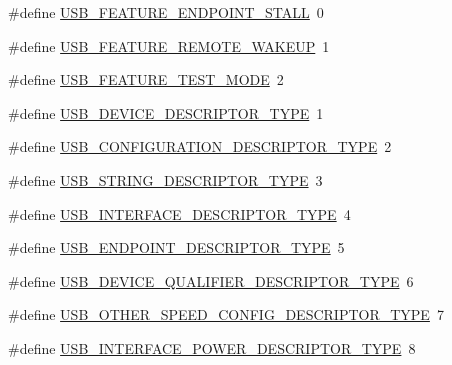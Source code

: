 \begin{DoxyCompactItemize}
\item 
\#define \hyperlink{group___u_s_b_d___core_ga3ff0518fb298c9c9b556f59c0468ec0d}{U\+S\+B\+\_\+\+F\+E\+A\+T\+U\+R\+E\+\_\+\+E\+N\+D\+P\+O\+I\+N\+T\+\_\+\+S\+T\+A\+LL}~0
\item 
\#define \hyperlink{group___u_s_b_d___core_ga2185a0541f4155470596c9c739c1656b}{U\+S\+B\+\_\+\+F\+E\+A\+T\+U\+R\+E\+\_\+\+R\+E\+M\+O\+T\+E\+\_\+\+W\+A\+K\+E\+UP}~1
\item 
\#define \hyperlink{group___u_s_b_d___core_ga90a1a76a81c04849dc897dacf6c3a213}{U\+S\+B\+\_\+\+F\+E\+A\+T\+U\+R\+E\+\_\+\+T\+E\+S\+T\+\_\+\+M\+O\+DE}~2
\end{DoxyCompactItemize}
\begin{DoxyCompactItemize}
\item 
\#define \hyperlink{group___u_s_b_d___core_ga722f2d6ee2892228b6708e8b9904c645}{U\+S\+B\+\_\+\+D\+E\+V\+I\+C\+E\+\_\+\+D\+E\+S\+C\+R\+I\+P\+T\+O\+R\+\_\+\+T\+Y\+PE}~1
\item 
\#define \hyperlink{group___u_s_b_d___core_ga45e81401e4b530280fdd539da1b06c26}{U\+S\+B\+\_\+\+C\+O\+N\+F\+I\+G\+U\+R\+A\+T\+I\+O\+N\+\_\+\+D\+E\+S\+C\+R\+I\+P\+T\+O\+R\+\_\+\+T\+Y\+PE}~2
\item 
\#define \hyperlink{group___u_s_b_d___core_gab01c9c74f2eb266b20aecd48bab4b35c}{U\+S\+B\+\_\+\+S\+T\+R\+I\+N\+G\+\_\+\+D\+E\+S\+C\+R\+I\+P\+T\+O\+R\+\_\+\+T\+Y\+PE}~3
\item 
\#define \hyperlink{group___u_s_b_d___core_gad1699884fa580bba35246a566264c978}{U\+S\+B\+\_\+\+I\+N\+T\+E\+R\+F\+A\+C\+E\+\_\+\+D\+E\+S\+C\+R\+I\+P\+T\+O\+R\+\_\+\+T\+Y\+PE}~4
\item 
\#define \hyperlink{group___u_s_b_d___core_ga4e8d6d81a224f8b511edc92b6cb4e085}{U\+S\+B\+\_\+\+E\+N\+D\+P\+O\+I\+N\+T\+\_\+\+D\+E\+S\+C\+R\+I\+P\+T\+O\+R\+\_\+\+T\+Y\+PE}~5
\item 
\#define \hyperlink{group___u_s_b_d___core_ga7158946184590ea6cfcb406d7f3c4ce5}{U\+S\+B\+\_\+\+D\+E\+V\+I\+C\+E\+\_\+\+Q\+U\+A\+L\+I\+F\+I\+E\+R\+\_\+\+D\+E\+S\+C\+R\+I\+P\+T\+O\+R\+\_\+\+T\+Y\+PE}~6
\item 
\#define \hyperlink{group___u_s_b_d___core_ga0d886bcc28cf10d730106d7be9b661fd}{U\+S\+B\+\_\+\+O\+T\+H\+E\+R\+\_\+\+S\+P\+E\+E\+D\+\_\+\+C\+O\+N\+F\+I\+G\+\_\+\+D\+E\+S\+C\+R\+I\+P\+T\+O\+R\+\_\+\+T\+Y\+PE}~7
\item 
\#define \hyperlink{group___u_s_b_d___core_ga3356db66a2c62f7018f23f9189ba34c9}{U\+S\+B\+\_\+\+I\+N\+T\+E\+R\+F\+A\+C\+E\+\_\+\+P\+O\+W\+E\+R\+\_\+\+D\+E\+S\+C\+R\+I\+P\+T\+O\+R\+\_\+\+T\+Y\+PE}~8

\end{DoxyCompactItemize}
